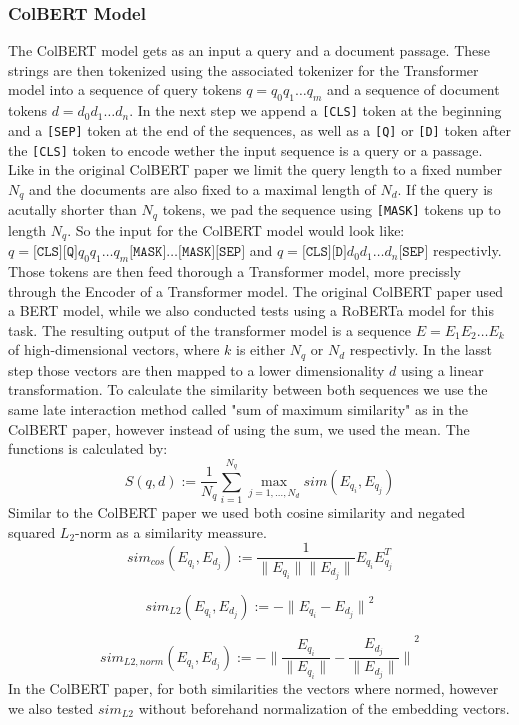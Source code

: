 \documentclass{article}
\begin{document}
\subsubsection{ColBERT Model}
The ColBERT model gets as an input a query and a document passage. These strings are then tokenized using the associated tokenizer for the Transformer model into a sequence of query tokens $q = q_0q_1\dots q_m$ and a sequence of document tokens $d = d_0d_1\dots d_n$.  In the next step we append a \texttt{[CLS]} token at the beginning and a \texttt{[SEP]} token at the end of the sequences, as well as a \texttt{[Q]} or \texttt{[D]} token after the \texttt{[CLS]} token to encode wether the input sequence is a query or a passage. Like in the original ColBERT paper we limit the query length to a fixed number $N_q$ and the documents are also fixed to a maximal length of $N_d$. If the query is acutally shorter than $N_q$ tokens, we pad the sequence using \texttt{[MASK]} tokens up to length $N_q$. So the input for the ColBERT model would look like: $q = \texttt{[CLS]}\texttt{[Q]}q_0q_1 \dots q_m\texttt{[MASK]}\dots\texttt{[MASK]}\texttt{[SEP]}$ and $q = \texttt{[CLS]}\texttt{[D]}d_0d_1 \dots d_n\texttt{[SEP]}$ respectivly. Those tokens are then feed thorough a Transformer model, more precissly through the Encoder of a Transformer model. The original ColBERT paper used a BERT model, while we also conducted tests using a RoBERTa model for this task. The resulting output of the transformer model is a sequence $E = E_1E_2 \dots E_k$ of high-dimensional vectors, where $k$ is either $N_q$ or $N_d$ respectivly. In the lasst step those vectors are then mapped to a lower dimensionality $d$ using a linear transformation. To calculate the similarity between both sequences we use the same late interaction method called "sum of maximum similarity" as in the ColBERT paper, however instead of using the sum, we used the mean. The functions is calculated by:
$$ S(q,d) := \frac{1}{N_q} \sum_{i=1}^{N_q} \max_{j = 1, \dots, N_d} sim(E_{q_i}, E_{q_j})
$$
Similar to the ColBERT paper we used both cosine similarity and negated squared $L_2$-norm as a similarity meassure. 
$$
sim_{cos}(E_{q_i}, E_{d_j}) := \frac{1}{\| E_{q_i} \|\| E_{d_j} \|} E_{q_i}E_{q_j}^T $$

$$
sim_{L2}(E_{q_i}, E_{d_j}) := -{\| E_{q_i} -E_{d_j} \|}^2
$$

$$
sim_{L2,norm}(E_{q_i}, E_{d_j}) := -{\| \frac{E_{q_i}}{\| E_{q_i} \|}  - \frac{E_{d_j}}{\| E_{d_j} \|} \|}^2
$$
In the ColBERT paper, for both similarities the vectors where normed, however we also tested $sim_{L2}$ without beforehand normalization of the embedding vectors.
\end{document}
